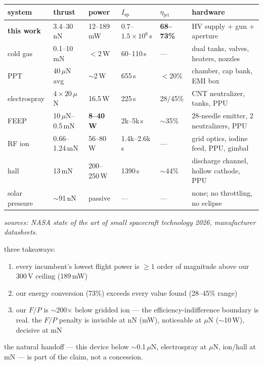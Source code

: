 \documentclass[11pt]{article}
\begin{document}
\begin{center}\footnotesize
\begin{tabular}{llllll}
\toprule
system & thrust & power & $I_{\mathrm{sp}}$ & $\eta_{\mathrm{jet}}$ &
  hardware \\
\midrule
\textbf{\textcolor{accent}{this work}} & 3.4--30\,nN & 12--189\,mW &
  $0.7$--$1.5\!\times\!10^6$\,s & \textbf{68--73\%} &
  HV supply + gun + aperture \\
cold gas & 0.1--10\,mN & $<$2\,W & 60--110\,s & --- &
  dual tanks, valves, heaters, nozzles \\
PPT & 40\,$\mu$N avg & $\sim$2\,W & 655\,s & $<$20\% &
  chamber, cap bank, EMI box \\
electrospray & $4\!\times\!20$\,$\mu$N & 16.5\,W & 225\,s & 28/45\% &
  CNT neutralizer, tanks, PPU \\
FEEP & 10\,$\mu$N--0.5\,mN & \textbf{8--40\,W} & 2k--5k\,s & $\sim$35\% &
  28-needle emitter, 2 neutralizers, PPU \\
RF ion & 0.66--1.24\,mN & 56--80\,W & 1.4k--2.6k\,s & --- &
  grid optics, iodine feed, PPU, gimbal \\
hall & 13\,mN & 200--250\,W & 1390\,s & $\sim$44\% &
  discharge channel, hollow cathode, PPU \\
solar pressure & $\sim$91\,nN & passive & --- & --- &
  none; no throttling, no eclipse \\
\bottomrule
\end{tabular}
\end{center}
{\small\itshape sources: NASA state of the art of small spacecraft technology
2026, manufacturer datasheets.}

\medskip
three takeaways:
\begin{enumerate}
  \item every incumbent's lowest flight power is $\ge 1$ order of magnitude
        above our 300\,V ceiling (189\,mW)
  \item our energy conversion (73\%) exceeds every value found (28--45\% range)
  \item our $F/P$ is $\sim$200$\times$ below gridded ion --- the
        efficiency-indifference boundary is real.  the $F/P$ penalty is
        invisible at nN (mW), noticeable at $\mu$N ($\sim$10\,W), decisive
        at mN
\end{enumerate}

the natural handoff --- this device below $\sim$0.1\,$\mu$N, electrospray at
$\mu$N, ion/hall at mN --- is part of the claim, not a concession.
\end{document}
